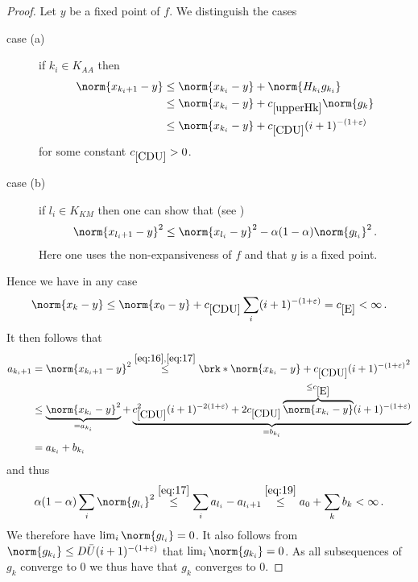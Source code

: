 \begin{proof}
Let $y$ be a fixed point of $f$. We distinguish the cases
\begin{description}
	\item[case (a)]
	if $k_i\in K_{AA}$ then
	\begin{equation}
	\begin{aligned}
		\norm{x_{k_i+1}-y}&\leq \norm{x_{k_i}-y}+\norm{H_{k_i}g_{k_i}} \\
		&\leq \norm{x_{k_i}-y}+\useconstant{upperHk}\norm{g_k} \\
		&\leq \norm{x_{k_i}-y}+\useconstant{CDU}(i+1)^{-(1+\e)}
		\label{eq:16}
	\end{aligned}
	\end{equation}
	for some constant $\useconstant{CDU}>0$.
	\item[case (b)]
	if $l_i\in K_{KM}$ then one can show that (see \cite[Theorem 6]{ZhaAA})
	\begin{align}
		\norm{x_{l_i+1}-y}^2\leq \norm{x_{l_i}-y}^2-\alpha(1-\alpha)\norm{g_{l_i}}^2
		\label{eq:17}\,.
	\end{align}
	Here one uses the non-expansiveness of $f$ and that $y$ is a fixed point.
\end{description}
Hence we have in any case
\begin{align*}
	\norm{x_k-y}
	\leq \norm{x_0-y}+\useconstant{CDU}\sum_i(i+1)^{-(1+\e)}
	= \useconstant{E}<\infty\,.
\end{align*}
It then follows that
\begin{equation}
\begin{aligned}
	a_{{k_i}+1} &= \norm{x_{{k_i}+1}-y}^2\stackrel{\eqref{eq:16}, \eqref{eq:17}}{\leq}\brk*{\norm{x_{k_i}-y}+\useconstant{CDU}(i+1)^{-(1+\e)}}^2 \\
	&\leq \underbrace{\norm{x_{k_i}-y}^2}_{=a_{k_i}}+\underbrace{\useconstant{CDU}^2(i+1)^{-2(1+\e)}+2\useconstant{CDU}\overbrace{\norm{x_{k_i}-y}}^{\leq \useconstant{E}}(i+1)^{-(1+\e)}}_{=b_{k_i}} \\
	&= a_{k_i}+b_{k_i}
\end{aligned}
\label{eq:19}
\end{equation}
and thus
\begin{align*}
	\alpha(1-\alpha)\sum_i\norm{g_{l_i}}^2
	\stackrel{\eqref{eq:17}}{\leq} \sum_i a_{l_i}-a_{l_i+1}
	\stackrel{\eqref{eq:19}}{\leq}a_0+\sum_k b_k
	<\infty\,.
\end{align*}
We therefore have $\lim_i\norm{g_{l_i}}=0$. It also follows from $\norm{g_{k_i}}\leq D\barU (i+1)^{-(1+\e)}$ that $\lim_i\norm{g_{k_i}}=0$. As all subsequences of $g_k$ converge to $0$ we thus have that $g_k$ converges to $0$.


\end{proof}
